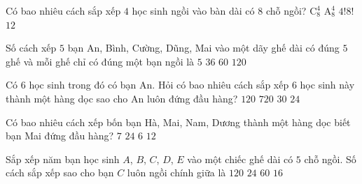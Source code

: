 

\begin{ex}%
	Có bao nhiêu cách sắp xếp $4$ học sinh ngồi vào bàn dài có $8$ chỗ  ngồi?
	 \choice
		 {$\mathrm{C}_{8}^{4}$}
		{\True $\mathrm{A}_{8}^{4}$} 
		{$4!8!$} 
		{$12$} 
\end{ex}

\begin{ex}%
	Số cách xếp $5$ bạn An, Bình, Cường, Dũng, Mai vào một dãy ghế  dài có đúng $5$ ghế và mỗi ghế chỉ có đúng một bạn ngồi là
	 \choice
		 {$5$}
		{$36$} 
		{$60$} 
		{\True $120$} 
\end{ex}

\begin{ex}%
	Có $6 $ học sinh trong đó có bạn An. Hỏi có bao nhiêu cách sắp xếp $6$ học sinh này thành một hàng  dọc sao cho An luôn đứng đầu hàng?
	\choice 
		{\True  $120$}
		{$720$} 
		 {$30$}
		{$24$} 
\end{ex}

\begin{ex}%
	Có bao nhiêu cách xếp bốn bạn Hà, Mai, Nam, Dương thành một hàng dọc biết bạn Mai đứng đầu  hàng?
	\choice 
		{$7$} 
		 {$24$}
		{\True $6$} 
		 {$12$}
\end{ex}

\begin{ex}%
	Sắp xếp năm bạn học sinh $A$, $B$, $C$, $D$, $E$ vào một chiếc ghế dài có $5$ chỗ ngồi. Số cách sắp xếp sao cho  bạn $C$ luôn ngồi chính giữa là
	 \choice
		{$120$} 
		{\True $24$} 
		{$60$} 
		 {$16$}
\end{ex}

